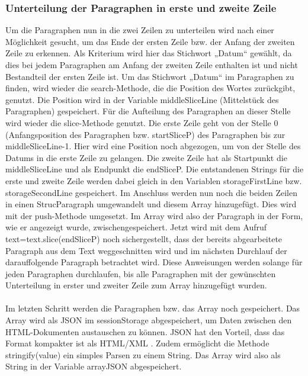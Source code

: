 \subsubsection{Unterteilung der Paragraphen in erste und zweite Zeile}
Um die Paragraphen nun in die zwei Zeilen zu unterteilen wird nach einer Möglichkeit gesucht, um das Ende der ersten Zeile bzw. der Anfang der zweiten Zeile zu erkennen. Als Kriterium wird hier das Stichwort „Datum“ gewählt, da dies bei jedem Paragraphen am Anfang der zweiten Zeile enthalten ist und nicht Bestandteil der ersten Zeile ist. Um das Stichwort „Datum“ im Paragraphen zu finden, wird wieder die search-Methode, die die Position des Wortes zurückgibt, genutzt. Die Position wird in der Variable middleSliceLine (Mittelstück des Paragraphen) gespeichert. Für die Aufteilung des Paragraphen an dieser Stelle wird wieder die slice-Methode genutzt. Die erste Zeile geht von der Stelle 0 (Anfangsposition des Paragraphen bzw. startSliceP) des Paragraphen bis zur middleSliceLine-1. Hier wird eine Position noch abgezogen, um von der Stelle des Datums in die erste Zeile zu gelangen. Die zweite Zeile hat als Startpunkt die middleSliceLine und als Endpunkt die endSliceP. Die entstandenen Strings für die erste und zweite Zeile werden dabei gleich in den Variablen storageFirstLine bzw. storageSecondLine gespeichert. Im Anschluss werden nun noch die beiden Zeilen in einen StrucParagraph umgewandelt und diesem Array hinzugefügt. Dies wird mit der push-Methode umgesetzt. Im Array wird also der Paragraph in der Form, wie er angezeigt wurde, zwischengespeichert. Jetzt wird mit dem Aufruf text=text.slice(endSliceP) noch sichergestellt, dass der bereits abgearbeitete Paragraph aus dem Text weggeschnitten wird und im nächsten Durchlauf der darauffolgende Paragraph betrachtet wird.
Diese Anweisungen werden solange für jeden Paragraphen durchlaufen, bis alle Paragraphen mit der gewünschten Unterteilung in erster und zweiter Zeile zum Array hinzugefügt wurden.\\
\\
Im letzten Schritt werden die Paragraphen bzw. das Array noch gespeichert. Das Array wird als \ac{JSON} im sessionStorage abgespeichert, um Daten zwischen den HTML-Dokumenten austauschen zu können. JSON hat den Vorteil, dass das Format kompakter ist als HTML/XML \cite[S. 374]{duckett}. Zudem ermöglicht die Methode stringify(value) ein simples Parsen zu einem String. Das Array wird also als String in der Variable arrayJSON abgespeichert. 

